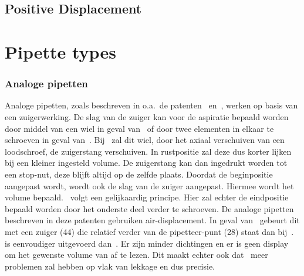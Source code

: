 \subsection{Positive Displacement}
\section{Pipette types}
\subsubsection{Analoge pipetten}
Analoge pipetten, zoals beschreven in o.a.\ de patenten\ \cite{RN16} en\ \cite{RN17}, werken op basis van een zuigerwerking. De slag van de zuiger kan voor de aspiratie bepaald worden door middel van een wiel in geval van\ \cite{RN17} of door twee elementen in elkaar te schroeven in geval van\ \cite{RN16}. Bij\ \cite{RN17} zal dit wiel, door het axiaal verschuiven van een loodschroef, de zuigerstang verschuiven. In rustpositie zal deze dus korter lijken bij een kleiner ingesteld volume. De zuigerstang kan dan ingedrukt worden tot een stop-nut, deze blijft altijd op de zelfde plaats. Doordat de beginpositie aangepast wordt, wordt ook de slag van de zuiger aangepast. Hiermee wordt het volume bepaald.\ \cite{RN16} volgt een gelijkaardig principe. Hier zal echter de eindpositie bepaald worden door het onderste deel verder te schroeven. De analoge pipetten beschreven in deze patenten gebruiken air-displacement. In geval van\ \cite{RN17} gebeurt dit met een zuiger (44) die relatief verder van de pipetteer-punt (28) staat dan bij\ \cite{RN16}.\ \cite{RN16} is eenvoudiger uitgevoerd dan\ \cite{RN17}. Er zijn minder dichtingen en er is geen display om het gewenste volume van af te lezen. Dit maakt echter ook dat\ \cite{RN16} meer problemen zal hebben op vlak van lekkage en dus precisie.
